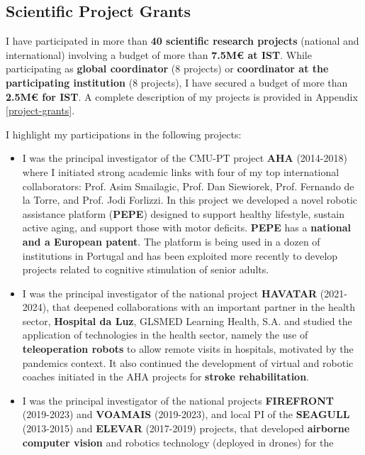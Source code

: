 \subsection{Scientific Project Grants}\label{scientific-project-grants}

I have participated in more than \textbf{40 scientific research
projects} (national and international) involving a budget of more than
\textbf{7.5M€ at IST}. While participating as \textbf{global
coordinator} (8 projects) or \textbf{coordinator at the participating
institution} (8 projects), I have secured a budget of more than
\textbf{2.5M€ for IST}. A complete description of my projects is
provided in Appendix \ref{project-grants}.

I highlight my participations in the following projects:

\begin{itemize}
\item
  I was the principal investigator of the CMU-PT project \textbf{AHA}
  (2014-2018) where I initiated strong academic links with four of my
  top international collaborators: Prof. Asim Smailagic, Prof. Dan
  Siewiorek, Prof. Fernando de la Torre, and Prof. Jodi Forlizzi. In
  this project we developed a novel robotic assistance platform
  (\textbf{PEPE}) designed to support healthy lifestyle, sustain active
  aging, and support those with motor deficits. \textbf{PEPE} has a
  \textbf{national and a European patent}. The platform is being used in
  a dozen of institutions in Portugal and has been exploited more
  recently to develop projects related to cognitive stimulation of
  senior adults.
\item
  I was the principal investigator of the national project
  \textbf{HAVATAR} (2021-2024), that deepened collaborations with an
  important partner in the health sector, \textbf{Hospital da Luz},
  GLSMED Learning Health, S.A. and studied the application of
  technologies in the health sector, namely the use of
  \textbf{teleoperation robots} to allow remote visits in hospitals,
  motivated by the pandemics context. It also continued the development
  of virtual and robotic coaches initiated in the AHA projects for
  \textbf{stroke rehabilitation}.
\item
  I was the principal investigator of the national projects
  \textbf{FIREFRONT} (2019-2023) and \textbf{VOAMAIS} (2019-2023), and
  local PI of the \textbf{SEAGULL} (2013-2015) and \textbf{ELEVAR}
  (2017-2019) projects, that developed \textbf{airborne computer vision}
  and robotics technology (deployed in drones) for the

\end{itemize}
